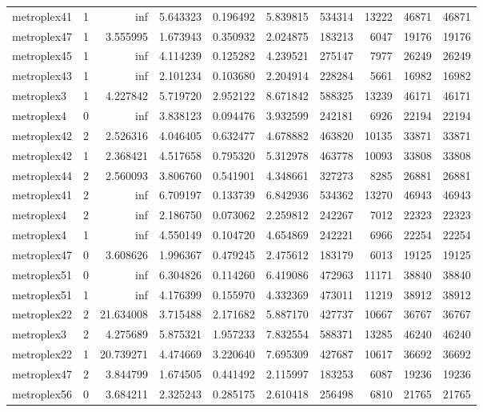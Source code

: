 \begin{longtable}{|l|r|r|r|r|r|r|r|r|r|}
metroplex41 & 1 & inf & 5.643323 & 0.196492 & 5.839815 & 534314 & 13222 & 46871 & 46871 \\
metroplex47 & 1 & 3.555995 & 1.673943 & 0.350932 & 2.024875 & 183213 & 6047 & 19176 & 19176 \\
metroplex45 & 1 & inf & 4.114239 & 0.125282 & 4.239521 & 275147 & 7977 & 26249 & 26249 \\
metroplex43 & 1 & inf & 2.101234 & 0.103680 & 2.204914 & 228284 & 5661 & 16982 & 16982 \\
metroplex3 & 1 & 4.227842 & 5.719720 & 2.952122 & 8.671842 & 588325 & 13239 & 46171 & 46171 \\
metroplex4 & 0 & inf & 3.838123 & 0.094476 & 3.932599 & 242181 & 6926 & 22194 & 22194 \\
metroplex42 & 2 & 2.526316 & 4.046405 & 0.632477 & 4.678882 & 463820 & 10135 & 33871 & 33871 \\
metroplex42 & 1 & 2.368421 & 4.517658 & 0.795320 & 5.312978 & 463778 & 10093 & 33808 & 33808 \\
metroplex44 & 2 & 2.560093 & 3.806760 & 0.541901 & 4.348661 & 327273 & 8285 & 26881 & 26881 \\
metroplex41 & 2 & inf & 6.709197 & 0.133739 & 6.842936 & 534362 & 13270 & 46943 & 46943 \\
metroplex4 & 2 & inf & 2.186750 & 0.073062 & 2.259812 & 242267 & 7012 & 22323 & 22323 \\
metroplex4 & 1 & inf & 4.550149 & 0.104720 & 4.654869 & 242221 & 6966 & 22254 & 22254 \\
metroplex47 & 0 & 3.608626 & 1.996367 & 0.479245 & 2.475612 & 183179 & 6013 & 19125 & 19125 \\
metroplex51 & 0 & inf & 6.304826 & 0.114260 & 6.419086 & 472963 & 11171 & 38840 & 38840 \\
metroplex51 & 1 & inf & 4.176399 & 0.155970 & 4.332369 & 473011 & 11219 & 38912 & 38912 \\
metroplex22 & 2 & 21.634008 & 3.715488 & 2.171682 & 5.887170 & 427737 & 10667 & 36767 & 36767 \\
metroplex3 & 2 & 4.275689 & 5.875321 & 1.957233 & 7.832554 & 588371 & 13285 & 46240 & 46240 \\
metroplex22 & 1 & 20.739271 & 4.474669 & 3.220640 & 7.695309 & 427687 & 10617 & 36692 & 36692 \\
metroplex47 & 2 & 3.844799 & 1.674505 & 0.441492 & 2.115997 & 183253 & 6087 & 19236 & 19236 \\
metroplex56 & 0 & 3.684211 & 2.325243 & 0.285175 & 2.610418 & 256498 & 6810 & 21765 & 21765 \\

\end{longtable}
